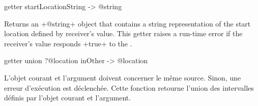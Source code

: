 
\begin{galgas3}
getter startLocationString -> @string
\end{galgas3}


Returns an \ggst+@string+ object that contains a string representation of the start location defined by receiver's value. This getter raises a run-time error if the receiver's value responds \ggst+true+ to the .



\begin{galgas3}
getter union ?@location inOther -> @location
\end{galgas3}

L'objet courant et l'argument doivent concerner le même source. Sinon, une erreur d'exécution est déclenchée. Cette fonction retourne l'union des intervalles définis par l'objet courant et l'argument.

